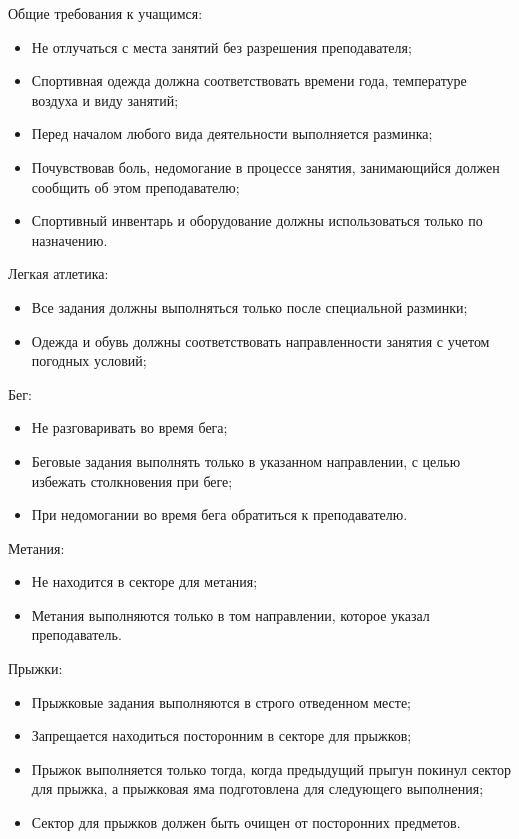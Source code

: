 \begin{flushleft}
Общие требования к учащимся:
\begin{itemize}
    \item Не отлучаться с места занятий без разрешения преподавателя;
    \item Спортивная одежда должна соответствовать времени года, температуре воздуха и виду занятий;
    \item Перед началом любого вида деятельности выполняется разминка;
    \item Почувствовав боль, недомогание в процессе занятия, занимающийся должен со­общить об этом преподавателю;
    \item Спортивный инвентарь и оборудование должны использоваться только по назна­чению.
\end{itemize}
\vspace*{14pt}

Легкая атлетика:
\begin{itemize}
    \item Все задания должны выполняться только после специальной разминки;
    \item Одежда и обувь должны соответствовать направленности занятия с учетом погод­ных условий;
\end{itemize}
\newpage

Бег:
\begin{itemize}
    \item Не разговаривать во время бега;
    \item Беговые задания выполнять только в указанном направлении, с целью избежать столкновения при беге;
    \item При недомогании во время бега обратиться к преподавателю.
\end{itemize}
\vspace*{14pt}

Метания:
\begin{itemize}
    \item Не находится в секторе для метания;
    \item Метания выполняются только в том направлении, которое указал преподаватель.
\end{itemize}
\vspace*{14pt}

Прыжки:
\begin{itemize}
    \item Прыжковые задания выполняются в строго отведенном месте;
    \item Запрещается находиться посторонним в секторе для прыжков;
    \item Прыжок выполняется только тогда, когда предыдущий прыгун покинул сектор для прыжка, а прыжковая яма подготовлена для следующего выполнения;
    \item Сектор для прыжков должен быть очищен от посторонних предметов.
\end{itemize}
\vspace*{14pt}


\end{flushleft}
